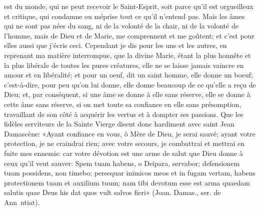 est du monde, qui ne peut recevoir le Saint-Esprit, soit parce qu'il est orgueilleux et critique, qui condamne ou
méprise tout ce qu'il n'entend pas. Mais les âmes qui ne sont pas nées du sang, ni de la volonté de la chair, ni de
la volonté de l'homme, mais de Dieu et de Marie, me comprennent et me goûtent; et c'est pour elles aussi que
j'écris ceci.
 Cependant je dis pour les uns et les autres, en reprenant ma matière interrompue, que la divine Marie, étant
la plus honnête et la plus libérale de toutes les pures créatures, elle ne se laisse jamais vaincre en amour et en
libéralité; et pour un oeuf, dit un saint homme, elle donne un boeuf; c'est-à-dire, pour peu qu'on lui donne, elle
donne beaucoup de ce qu'elle a reçu de Dieu; et, par conséquent, si une âme se donne à elle sans réserve, elle se
donne à cette âme sans réserve, si on met toute sa confiance en elle sans présomption, travaillant de son côté à
acquérir les vertus et à dompter ses passions.
 Que les fidèles serviteurs de la Sainte Vierge disent donc hardiment avec saint Jean Damascène: «Ayant
confiance en vous, ô Mère de Dieu, je serai sauvé; ayant votre protection, je ne craindrai rien; avec votre secours,
je combattrai et mettrai en fuite mes ennemis: car votre dévotion est une arme de salut que Dieu donne à ceux
qu'il veut sauver: Spem tuam habens, o Deipara, servabor; defensionem tuam possidens, non timebo; persequar
inimicos meos et in fugam vertam, habens protectionem tuam et auxilium tuum; nam tibi devotum esse est arma
quaedam salutis quae Deus his dat quos vult salvos fieri» (Joan. Damas., ser. de Ann~ntiat).
